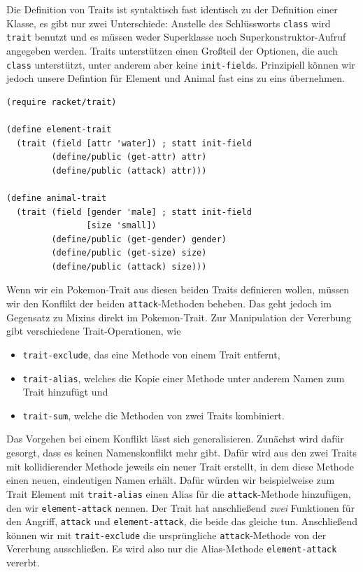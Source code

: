 Die Definition von Traits ist syntaktisch fast identisch zu der Definition einer Klasse, es gibt nur zwei Unterschiede: Anstelle des Schlüssworts \texttt{class} wird \texttt{trait} benutzt und es müssen weder Superklasse noch Superkonstruktor-Aufruf angegeben werden. Traits unterstützen einen Großteil der Optionen, die auch \texttt{class} unterstützt, unter anderem aber keine \texttt{init-field}s. Prinzipiell können wir jedoch unsere Defintion für Element und Animal fast eins zu eins übernehmen. 

\begin{lstlisting}
(require racket/trait)

(define element-trait
  (trait (field [attr 'water]) ; statt init-field
         (define/public (get-attr) attr)
         (define/public (attack) attr)))

(define animal-trait
  (trait (field [gender 'male] ; statt init-field
                [size 'small])
         (define/public (get-gender) gender)
         (define/public (get-size) size)
         (define/public (attack) size)))
\end{lstlisting}

Wenn wir ein Pokemon-Trait aus diesen beiden Traits definieren wollen, müssen wir den Konflikt der beiden \texttt{attack}-Methoden beheben. Das geht jedoch im Gegensatz zu Mixins direkt im Pokemon-Trait. Zur Manipulation der Vererbung gibt verschiedene Trait-Operationen, wie
\begin{itemize}
 \item \texttt{trait-exclude}, das eine Methode von einem Trait entfernt,
 \item \texttt{trait-alias}, welches die Kopie einer Methode unter anderem Namen zum Trait hinzufügt und
 \item \texttt{trait-sum}, welche die Methoden von zwei Traits kombiniert.
\end{itemize}

Das Vorgehen bei einem Konflikt lässt sich generalisieren. Zunächst wird dafür gesorgt, dass es keinen Namenskonflikt mehr gibt. Dafür wird aus den zwei Traits mit kollidierender Methode jeweils ein neuer Trait erstellt, in dem diese Methode einen neuen, eindeutigen Namen erhält. Dafür würden wir beispielweise zum Trait Element mit \texttt{trait-alias} einen Alias für die \texttt{attack}-Methode hinzufügen, den wir \texttt{element-attack} nennen. Der Trait hat anschließend \emph{zwei} Funktionen für den Angriff, \texttt{attack} und \texttt{element-attack}, die beide das gleiche tun. Anschließend können wir mit \texttt{trait-exclude} die ursprüngliche \texttt{attack}-Methode von der Vererbung ausschließen. Es wird also nur die Alias-Methode \texttt{element-attack} vererbt.

